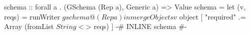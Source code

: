 \begin{code}
schema
    :: forall a
     . (GSchema (Rep a), Generic a)
    => Value
schema =
  let (v, reqs) = runWriter $ gschema @(Rep a)
   in mergeObjects v $ object
        [ "required" .=
            Array (fromList $ String <$> reqs)
        ]
{-# INLINE schema #-}
\end{code}
